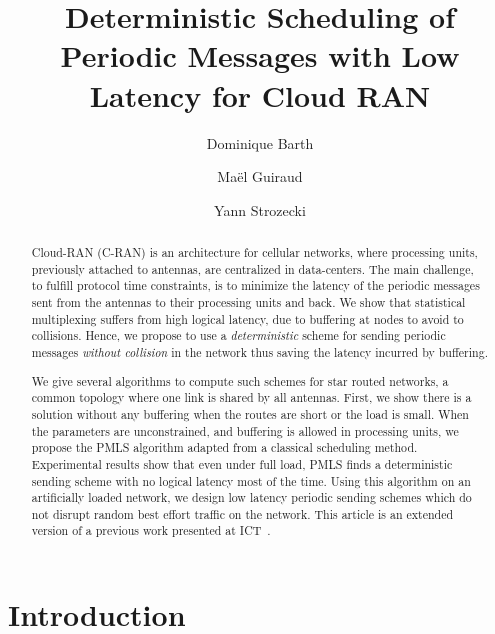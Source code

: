 \documentclass[a4paper,10pt]{article}
\title{Deterministic Scheduling of Periodic Messages with Low Latency for Cloud RAN}
\author[1]{Dominique Barth}
\author[1,2]{Ma\"el Guiraud}
\author[1]{Yann Strozecki}
\affil[1]{David Laboratory, UVSQ}
\affil[2]{Nokia Bell Labs France}
\begin{document}
\maketitle

\begin{abstract}
Cloud-RAN (C-RAN) is an architecture for cellular networks, where processing units, previously attached to antennas, are centralized in data-centers. The main challenge, to fulfill protocol time constraints, is to minimize the latency of the periodic messages sent from the antennas to their processing units and back. We show that statistical multiplexing suffers from high logical latency, due to buffering at nodes to avoid to collisions. Hence, we propose to use a \emph{deterministic} scheme for sending periodic messages \emph{without collision} in the network thus saving the latency incurred by buffering.

We give several algorithms to compute such schemes for star routed networks, a common topology where one link is shared by all antennas. First, we show there is a solution without any buffering when the routes are short or the load is small. When the parameters are unconstrained, and buffering is allowed in processing units, we propose the PMLS algorithm adapted from a classical scheduling method. Experimental results show that even under full load,  PMLS finds a deterministic sending scheme with no logical latency most of the time. Using this algorithm on an artificially loaded network, we design low latency periodic sending schemes which do not disrupt random best effort traffic on the network. This article is an extended version of a previous work presented at ICT~\cite{Guir1806:Deterministic}.
\end{abstract}


\section{Introduction}
\end{document}
